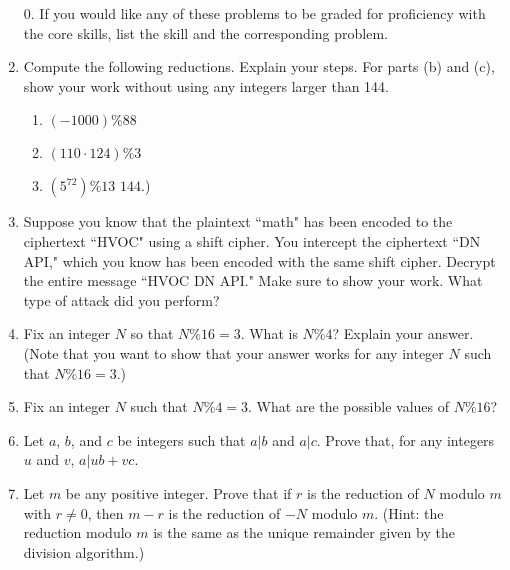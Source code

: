 \documentclass[12pt]{article}
\begin{document}
\begin{enumerate}
\item[0.] If you would like any of these problems to be graded for proficiency with the core skills, list the skill and the corresponding problem.
\item Compute the following reductions.  Explain your steps.  For parts (b) and (c), show your work without using any integers larger than 144. 
\begin{multicols}{3}
\begin{enumerate}
\item $(-1000) \% 88$
\item $(110\cdot 124) \% 3$ 
\item $\left(5^{72}\right) \% 13$ 
$144$.)
\end{enumerate}
\end{multicols}
\item Suppose you know that the plaintext ``math" has been encoded to the ciphertext ``HVOC" using a shift cipher.  You intercept the ciphertext ``DN API," which you know has been encoded with the same shift cipher.  Decrypt the entire message ``HVOC DN API." Make sure to show your work.   What type of attack did you perform?
\item Fix an integer $N$ so that $N\%16 = 3$.  What is $N\%4$?  Explain your answer. (Note that you want to show that your answer works for any integer $N$ such that $N\%16=3$.)

\item Fix an integer $N$ such that $N\%4=3$. What are the possible values of $N\%16$?

\item Let $a$, $b$, and $c$ be integers such that $a|b$ and $a|c$. Prove that,  for any integers $u$ and $v$, $a|ub+vc$. 

\item Let $m$ be any positive integer. Prove that  if $r$ is the reduction of $N$ modulo $m$ with $r\ne 0$, then $m-r$ is the reduction of $-N$ modulo $m$. (Hint: the reduction modulo $m$ is the same as the unique remainder given by the division algorithm.)

\end{enumerate}
\end{document}
